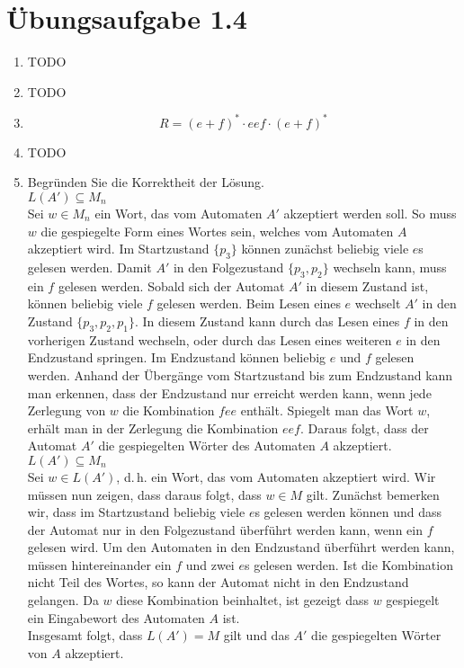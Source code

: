 \documentclass[a4paper]{scrartcl}
\begin{document}
\section*{Übungsaufgabe 1.4}
\begin{enumerate}
    \item TODO
    \item TODO
    \item
        \begin{equation}
            R = (e + f)^* \cdot eef \cdot (e + f)^*
        \end{equation}
        
    \item TODO
    \item Begründen Sie die Korrektheit der Lösung. \\
    	$L(A') \subseteq M_n$ \\
    	Sei $w \in M_n$ ein Wort, das vom Automaten $A'$ akzeptiert werden soll.
        So muss $w$ die gespiegelte Form eines Wortes sein, welches vom
        Automaten $A$ akzeptiert wird.
        Im Startzustand $\{p_3\}$ können zunächst beliebig viele $e$s gelesen
        werden.
        Damit $A'$ in den Folgezustand $\{p_3,p_2\}$ wechseln kann, muss ein $f$
        gelesen werden.
        Sobald sich der Automat $A'$ in diesem Zustand ist, können beliebig
        viele $f$ gelesen werden.
        Beim Lesen eines $e$ wechselt $A'$ in den Zustand $\{p_3,p_2,p_1\}$.
        In diesem Zustand kann durch das Lesen eines $f$ in den vorherigen
        Zustand wechseln, oder durch das Lesen eines weiteren $e$ in den
        Endzustand springen.
        Im Endzustand können beliebig $e$ und $f$ gelesen werden.
        Anhand der Übergänge vom Startzustand bis zum Endzustand kann man
        erkennen, dass der Endzustand nur erreicht werden kann, wenn jede
        Zerlegung von $w$ die Kombination $fee$ enthält.
        Spiegelt man das Wort $w$, erhält man in der Zerlegung die Kombination
        $eef$.
        Daraus folgt, dass der Automat $A'$ die gespiegelten Wörter des
        Automaten $A$ akzeptiert. \\
    	
    	$L(A') \subseteq M_n$ \\
   		Sei $w \in L(A')$, d.\,h. ein Wort, das vom Automaten akzeptiert wird.
        Wir müssen nun zeigen, dass daraus folgt, dass $w \in M$ gilt.
        Zunächst bemerken wir, dass im Startzustand beliebig viele $e$s gelesen
        werden können und dass der Automat nur in den Folgezustand überführt
        werden kann, wenn ein $f$ gelesen wird.
        Um den Automaten in den Endzustand überführt werden kann, müssen
        hintereinander ein $f$ und zwei $e$s gelesen werden.
        Ist die Kombination nicht Teil des Wortes, so kann der Automat nicht in
        den Endzustand gelangen.
        Da $w$ diese Kombination beinhaltet, ist gezeigt dass $w$ gespiegelt
        ein Eingabewort des Automaten $A$ ist. \\
   		Insgesamt folgt, dass $L(A') = M$ gilt und das $A'$ die gespiegelten
        Wörter von $A$ akzeptiert.  
    	
    	  

    	
\end{enumerate}
\end{document}
